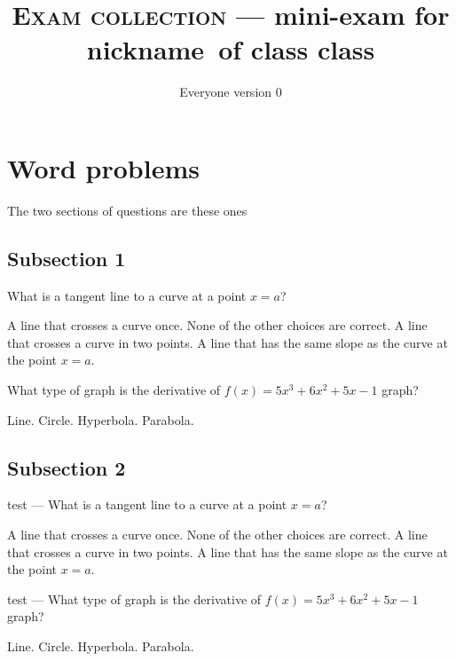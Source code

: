 \documentclass{exam}
\newcommand{\class}{class}
\newcommand{\nickname}{nickname}
\newcommand\myversion{0}
\begin{document}
\author{Everyone version \myversion}
\title{\textsc{Exam collection} --- mini-exam for \nickname\ of class \class}


\maketitle


\section{Word problems}

The two sections of questions are these ones


\subsection{Subsection 1}\begin{questions}


	\question What is a tangent line to a curve at a point $x = a$?

	\begin{choices}
		\choice A line that crosses a  curve once.
		\choice None of the other choices are correct.
		\choice A line that crosses a curve in two points.
		\CorrectChoice A line that has the same slope as the curve at the point $x = a$.
	\end{choices}
	\question What type of graph is the derivative of $f(x)= 5x^3+6x^2+5x-1$ graph?

	\begin{choices}
		\choice Line.
		\choice Circle.
		\choice Hyperbola.
		\CorrectChoice Parabola.
	\end{choices}

\end{questions}

\subsection{Subsection 2}
\begin{questions}


	\question test --- What is a tangent line to a curve at a point $x = a$?

	\begin{choices}
		\choice A line that crosses a  curve once.
		\choice None of the other choices are correct.
		\choice A line that crosses a curve in two points.
		\CorrectChoice A line that has the same slope as the curve at the point $x = a$.
	\end{choices}
	\question test --- What type of graph is the derivative of $f(x)= 5x^3+6x^2+5x-1$ graph?

	\begin{choices}
		\choice Line.
		\choice Circle.
		\choice Hyperbola.
		\CorrectChoice Parabola.
	\end{choices}

\end{questions}
\end{document}
